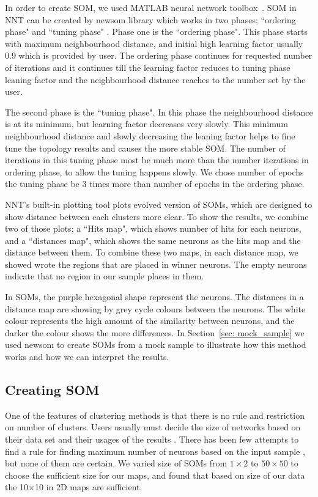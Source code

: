      In order to create SOM, we used {\tiny MATLAB} neural network toolbox~\citep[NNT,][]{matlabtolbox}.
     SOM in {\tiny NNT} can be created by {\tiny newsom} library which works in two phases; ``ordering phase" and ``tuning phase" . 
     Phase one is the ``ordering phase". 
     This phase starts with maximum neighbourhood distance, and initial high learning factor usually 0.9 which is provided by user. 
     The ordering phase continues for requested number of iterations and it continues till the learning factor reduces to tuning phase leaning factor and the neighbourhood distance reaches to the number set by the user.
     
     The second phase is the ``tuning phase".
     In this phase the neighbourhood distance is at its minimum, but learning factor decreases very slowly.
     This minimum neighbourhood distance and slowly decreasing the leaning factor helps to fine tune the topology results and causes the more stable SOM. 
     The number of iterations in this tuning phase most be much more than the number iterations in ordering phase, to allow the tuning happens slowly. 
     We chose number of epochs the tuning phase be 3 times more than number of epochs in the ordering phase.
     
     
     {\tiny NNT}'s built-in plotting tool plots evolved version of SOMs, which are designed to show distance between each clusters more clear.
     To show the results, we combine two of those plots; a ``Hits map", which shows number of hits for each neurons, and a ``distances map", which shows the same neurons as the hits map and the distance between them. 
     To combine these two maps, in each distance map, we showed wrote the regions that are placed in winner neurons.
     The empty neurons indicate that no region in our sample places in them.
     
     In SOMs, the purple hexagonal shape represent the neurons.
     The distances in a distance map are showing by grey cycle colours between the neurons.
     The white colour represents the high amount of the similarity between neurons, and the darker the colour shows the more differences.
     In Section~\ref{sec: mock_sample} we used {\tiny newsom} to create SOMs from a mock sample to illustrate how this method works and how we can interpret the results.
     
     \subsection{Creating SOM}
    \label{sec: create_som}
     One of the features of clustering methods is that there is no rule and restriction on number of clusters.
     Users usually must decide the size of networks based on their data set and their usages of the results .
     There has been few attempts to find a rule for finding maximum number of neurons based on the input sample \citep[e.g.][]{Vesanto05}, but none of them are certain. 
     We varied size of SOMs from $1\times2$ to $50\times50$ to choose the sufficient size for our maps, and found that based on size of our data the 10$\times$10 in 2D maps are sufficient. 
     
